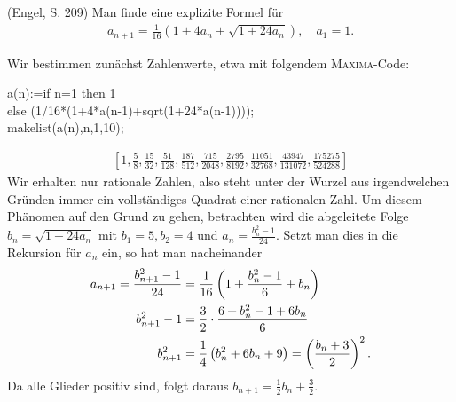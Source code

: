 \documentclass[11pt,a4paper]{article}
\newcommand{\cas}[1]{\textsc{#1}}
\begin{document}
\begin{aufgabe} (Engel, S. 209)
Man finde eine explizite Formel für
\begin{gather*}
a_{n+1}= \frac{1}{16} \left( 1+4 a_n + \sqrt{1 +24 a_n}\right), \quad a_1=1.
\end{gather*}
\end{aufgabe}

\begin{loesung} 
Wir bestimmen zunächst Zahlenwerte, etwa mit folgendem \cas{Maxima}-Code:
\begin{code}
  a(n):=if n=1 then 1\\
  else (1/16*(1+4*a(n-1)+sqrt(1+24*a(n-1))));\\[6pt]

  makelist(a(n),n,1,10);
\end{code}
\begin{gather*}
  \left[1, \frac{5}{8}, \frac{15}{32}, \frac{51}{128}, \frac{187}{512},
    \frac{715}{2048}, \frac{2795}{8192}, \frac{11051}{32768},
    \frac{43947}{131072}, \frac{175275}{524288}\right]
\end{gather*}
Wir erhalten nur rationale Zahlen, also steht unter der Wurzel aus
irgendwelchen Gründen immer ein vollständiges Quadrat einer rationalen Zahl.
Um diesem Phänomen auf den Grund zu gehen, betrachten wird die abgeleitete
Folge $b_n=\sqrt{1+24a_n}$ mit $b_1=5, b_2=4$ und $a_n=\frac{b_n^2-1}{24}$.
Setzt man dies in die Rekursion für $a_n$ ein, so hat man nacheinander
\begin{align*}
  a_{n+1}=\frac{b_{n+1}^2-1}{24}&=\frac{1}{16}\left(1+\frac{b_n^2-1}{6}+b_n\right)\\
  b_{n+1}^2-1&=\frac{3}{2}\cdot\frac{6+b_n^2-1+6b_n}{6}\\
  b_{n+1}^2&=\frac{1}{4}\left(b_n^2+6b_n+9\right)=\left(\frac{b_n+3}{2}\right)^2.
\end{align*}
Da alle Glieder positiv sind, folgt daraus $b_{n+1} = \frac12 b_n+\frac32.$


\end{loesung}
\end{document}
